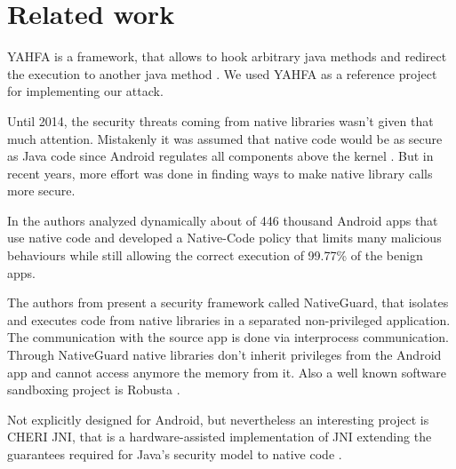 \section{Related work}
YAHFA is a framework, that allows to hook arbitrary java methods and redirect the execution to another java method \cite{YahfaGithub}. We used YAHFA as a reference project for implementing our attack. 
 
Until 2014, the security threats coming from native libraries wasn't given that much attention. Mistakenly it was assumed that native code would be as secure as Java code since Android regulates all components above the kernel \cite[p. 1]{Sun:2014:NPA:2627393.2627396}.
But in recent years, more effort was done in finding ways to make native library calls more secure.

In \cite{Afonso2016GoingNU} the authors analyzed dynamically about of 446 thousand Android apps that use native code and developed a Native-Code policy that limits many malicious behaviours while still allowing the correct execution of 99.77\% of the benign apps.

The authors from \cite{Sun:2014:NPA:2627393.2627396} present a security framework called NativeGuard, that isolates and executes code from native libraries in a separated non-privileged application. The communication with the source app is done via interprocess communication. Through NativeGuard native libraries don’t inherit privileges from the Android app and cannot access anymore the memory from it.
Also a well known software sandboxing project is Robusta \cite{Siefers:2010:RTN:1866307.1866331}. %

Not explicitly designed for Android, but nevertheless an interesting project is CHERI JNI, that is a hardware-assisted implementation of JNI extending the guarantees required for Java's security model to native code \cite{Chisnall:2017:CJS:3093337.3037725}.

